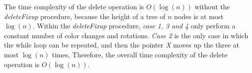 \documentclass[14pt]{article}
\begin{document}
    The time complexity of the delete operation is $O(\log(n))$ without the \textit{deleteFixup} procedure, because
    the height of a tree of $n$ nodes is at most $\log(n)$. \newline
    Within the \textit{deleteFixup} procedure, \textit{case 1, 3 and 4} only perform a constant number of color changes
    and rotations. \newline
    \textit{Case 2} is the only case in which the while loop can be repeated, and then the pointer \textit{X} moves up
    the three at most $\log(n)$ times. \newline
    Therefore, the overall time complexity of the delete operation is $O(\log(n))$.
\end{document}
